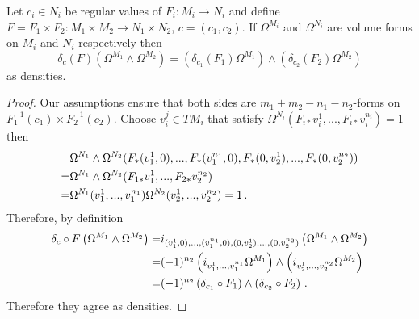 \begin{theorem}
Let $c_i\in N_i$ be regular values of $F_i:M_i\rightarrow N_i$ and define $F=F_1\times F_2:M_1\times M_2\rightarrow N_1\times N_2$, $c=(c_1,c_2)$. If $\Omega^{M_i}$ and $\Omega^{N_i}$ are volume forms on $M_i$ and $N_i$ respectively then 
\begin{equation}
\delta_c( F) \left(\Omega^{M_1}\wedge\Omega^{M_2}\right)=\left(\delta_{c_1}( F_1)\Omega^{M_1}\right)\wedge\left(\delta_{c_2}( F_2)\Omega^{M_2}\right)
\end{equation}
as densities.
\end{theorem}
\begin{proof}
Our assumptions ensure that both sides are $m_1+m_2-n_1-n_2$-forms on $F_1^{-1}(c_1)\times F_2^{-1}(c_2)$. Choose $v_i^j\in TM_i$ that satisfy $\Omega^{N_i}(F_{i*}v^1_i,...,F_{i*}v^{n_i}_i)=1$ then
\begin{align}
&\Omega^{N_1}\wedge \Omega^{N_2}(F_*(v_1^1,0),...,F_*(v_1^{n_1},0),F_*(0,v_2^1),...,F_*(0,v_2^{n_2}))\\
=&\Omega^{N_1}\wedge \Omega^{N_2}(F_{1*}v_1^1,...,F_{2*}v_2^{n_2})\notag\\
=&\Omega^{N_1}(v_1^1,...,v_1^{n_1})\Omega^{N_2}(v_2^1,...,v_2^{n_2})=1\,.\notag
\end{align}
Therefore, by definition
\begin{align}
\delta_c\circ F \left(\Omega^{M_1}\wedge\Omega^{M_2}\right)=&i_{(v_1^1,0),...,(v_1^{n_1},0),(0,v_2^1),...,(0,v_2^{n_2})}\left(\Omega^{M_1}\wedge\Omega^{M_2}\right)\\
=&(-1)^{n_2}\left(i_{v_1^1,...,v_1^{n_1}}\Omega^{M_1}\right)\wedge\left(i_{v_2^1,...,v_2^{n_2}}\Omega^{M_2}\right)\notag\\
=&(-1)^{n_2}\left(\delta_{c_1}\circ F_1\right)\wedge\left(\delta_{c_2}\circ F_2\right)\,.\notag
\end{align}
Therefore they agree as densities.
\end{proof}


